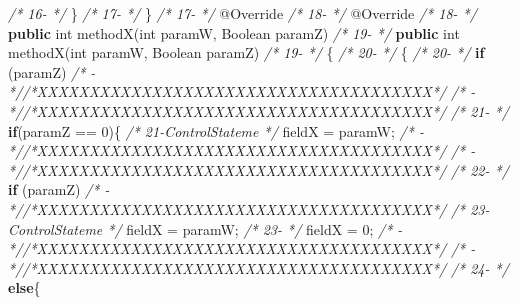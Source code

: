 \documentclass[
]{article}
\newenvironment{Shaded}{\begin{snugshade}}{\end{snugshade}}
\newcommand{\AttributeTok}[1]{\textcolor[rgb]{0.77,0.63,0.00}{#1}}
\newcommand{\BuiltInTok}[1]{#1}
\newcommand{\CommentTok}[1]{\textcolor[rgb]{0.56,0.35,0.01}{\textit{#1}}}
\newcommand{\DataTypeTok}[1]{\textcolor[rgb]{0.13,0.29,0.53}{#1}}
\newcommand{\DecValTok}[1]{\textcolor[rgb]{0.00,0.00,0.81}{#1}}
\newcommand{\FunctionTok}[1]{\textcolor[rgb]{0.00,0.00,0.00}{#1}}
\newcommand{\KeywordTok}[1]{\textcolor[rgb]{0.13,0.29,0.53}{\textbf{#1}}}
\newcommand{\NormalTok}[1]{#1}
\begin{document}
\begin{landscape}
\begin{Shaded}
\begin{Highlighting}[]
\CommentTok{/* 16-                 */}\NormalTok{    \}                                                          }\CommentTok{/* 17-                 */}\NormalTok{    \}                                                          }
\CommentTok{/* 17-                 */}    \AttributeTok{@Override}                                                  \CommentTok{/* 18-                 */}    \AttributeTok{@Override}                                                  
\CommentTok{/* 18-                 */}    \KeywordTok{public} \DataTypeTok{int} \FunctionTok{methodX}\NormalTok{(}\DataTypeTok{int}\NormalTok{ paramW, }\BuiltInTok{Boolean}\NormalTok{ paramZ)             }\CommentTok{/* 19-                 */}    \KeywordTok{public} \DataTypeTok{int} \FunctionTok{methodX}\NormalTok{(}\DataTypeTok{int}\NormalTok{ paramW, }\BuiltInTok{Boolean}\NormalTok{ paramZ)             }
\CommentTok{/* 19-                 */}\NormalTok{    \{                                                          }\CommentTok{/* 20-                 */}\NormalTok{    \{                                                          }
\CommentTok{/* 20-                 */}        \KeywordTok{if}\NormalTok{ (paramZ)                                            }\CommentTok{/*   -                 *//*XXXXXXXXXXXXXXXXXXXXXXXXXXXXXXXXXXXXXX*/}                     
\CommentTok{/*   -                 *//*XXXXXXXXXXXXXXXXXXXXXXXXXXXXXXXXXXXXXX*/}                     \CommentTok{/* 21-                 */}        \KeywordTok{if}\NormalTok{(paramZ == }\DecValTok{0}\NormalTok{)\{                                       }
\CommentTok{/* 21-ControlStateme   */}\NormalTok{            fieldX = paramW;                                   }\CommentTok{/*   -                 *//*XXXXXXXXXXXXXXXXXXXXXXXXXXXXXXXXXXXXXX*/}                     
\CommentTok{/*   -                 *//*XXXXXXXXXXXXXXXXXXXXXXXXXXXXXXXXXXXXXX*/}                     \CommentTok{/* 22-                 */}            \KeywordTok{if}\NormalTok{ (paramZ)                                        }
\CommentTok{/*   -                 *//*XXXXXXXXXXXXXXXXXXXXXXXXXXXXXXXXXXXXXX*/}                     \CommentTok{/* 23-ControlStateme   */}\NormalTok{                fieldX = paramW;                               }
\CommentTok{/* 23-                 */}\NormalTok{            fieldX = }\DecValTok{0}\NormalTok{;                                        }\CommentTok{/*   -                 *//*XXXXXXXXXXXXXXXXXXXXXXXXXXXXXXXXXXXXXX*/}                     
\CommentTok{/*   -                 *//*XXXXXXXXXXXXXXXXXXXXXXXXXXXXXXXXXXXXXX*/}                     \CommentTok{/* 24-                 */}            \KeywordTok{else}\NormalTok{\{                                              }

\end{Highlighting}
\end{Shaded}
\end{landscape}
\end{document}

